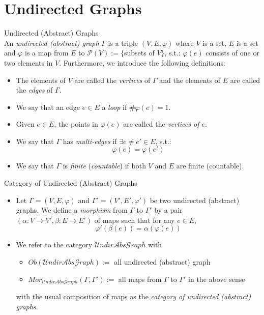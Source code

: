 \section{Undirected Graphs}
\begin{definition}{Undirected (Abstract) Graphs}\\
An \textit{undirected (abstract) graph} $\Gamma$ is a triple $(V,E,\varphi)$ where $V$ is a set, $E$ is a set and $\varphi$ is a map from $E$ to $\mathcal{P}(V):=\{$subsets of $V\}$, s.t.: $\varphi(e)$ consists of one or two elements in $V$. Furthermore, we introduce the following definitions:
\begin{itemize}
    \item The elements of $V$ are called the \textit{vertices} of $\Gamma$ and the elements of $E$ are called the \textit{edges} of $\Gamma$.
    \item We say that an edge $e \in E$ a \textit{loop} if $\# \varphi(e)=1$.
    \item Given $e\in E$, the points in $\varphi(e)$ are called the \textit{vertices of $e$}.
    \item We say that $\Gamma$ has \textit{multi-edges} if $\exists e \neq e' \in E$, s.t.:
    $$\varphi(e) =\varphi(e')$$
    \item We say that $\Gamma$ is \textit{finite} (\textit{countable}) if both $V$ and $E$ are finite (countable).
\end{itemize}
\end{definition}

\begin{definition}{Category of Undirected (Abstract) Graphs}\\
\begin{itemize}
    \item Let $\Gamma= (V,E,\varphi)$ and $\Gamma'= (V',E',\varphi')$ be two undirected (abstract) graphs. We define a \textit{morphism} from $\Gamma$ to $\Gamma'$ by a pair $(\alpha: V\to V', \beta: E \to E')$ of maps such that for any $e \in E$,
    $$\varphi' (\beta(e)) = \alpha(\varphi (e))$$

    \item We refer to the category $\mathcal{U}ndir\mathcal{A}bs\mathcal{G}raph$ with
    \begin{itemize}
        \item $Ob(\mathcal{U}ndir\mathcal{A}bs\mathcal{G}raph):=$ all undirected (abstract) graph
        \item $Mor_{\mathcal{U}ndir\mathcal{A}bs\mathcal{G}raph} (\Gamma,\Gamma') :=$ all maps from $\Gamma$ to $\Gamma'$ in the above sense
    \end{itemize}
    with the usual composition of maps as the \textit{category of undirected (abstract) graphs}.
\end{itemize}
\end{definition}


